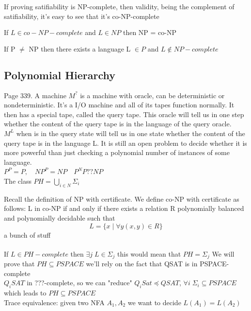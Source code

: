 \begin{theorem}
    If proving satifiability is NP-complete, then validity, being the complement of satifiability, it's easy to see that it's co-NP-complete
\end{theorem}

\begin{theorem}
    If $L \in co-NP-complete$ and $L \in NP$ then NP = co-NP
\end{theorem}

\begin{theorem}
    If P $\neq$ NP then there exists a language L $\in P$ and $L \notin NP-complete$
\end{theorem}

\subsection{Polynomial Hierarchy}
\begin{definition}
    Page 339. A machine $M^?$ is a machine with oracle, can be deterministic or nondeterministic. It's a I/O machine and all of its tapes function normally. It then has a special tape, called the query tape. This oracle will tell us in one step whether the content of the query tape is in the language of the query oracle.\\
    $M^L$ when is in the query state will tell us in one state whether the content of the query tape is in the language L. It is still an open problem to decide whether it is more powerful than just checking a polynomial number of instances of some language.\\
    $P^P=P, \quad NP^P = NP \quad P^NP ?? NP$\\
    The class $PH = \bigcup_{i\in N}\Sigma_i$
\end{definition}
Recall the definition of NP with certificate. We define co-NP with certificate as follows: L in co-NP if and only if there exists a relation R polynomially balanced and polynomially decidable such that 
\[ 
    L = \{x \mid \forall y (x,y) \in R\} 
\]
a bunch of stuff \\\\
If $L \in PH-complete$ then $\exists j \; L \in \Sigma_j$ this would mean that $PH=\Sigma_j$
We will prove that $PH \subseteq PSPACE$ we'll rely on the fact that QSAT is in PSPACE-complete\\
$Q_iSAT$ in ???-complete, so we can "reduce" $Q_iSat \preceq QSAT$, $\forall i \; \Sigma_i \subseteq PSPACE$ which leads to $PH \subseteq PSPACE$\\
Trace equivalence: given two NFA $A_1, A_2$ we want to decide $L(A_1) = L(A_2)$



